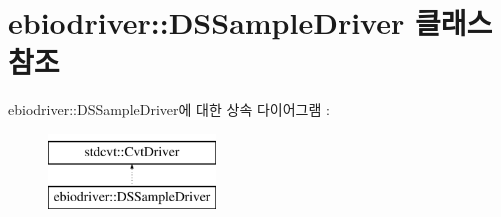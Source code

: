 \hypertarget{classebiodriver_1_1DSSampleDriver}{}\section{ebiodriver\+:\+:D\+S\+Sample\+Driver 클래스 참조}
\label{classebiodriver_1_1DSSampleDriver}
ebiodriver\+:\+:D\+S\+Sample\+Driver에 대한 상속 다이어그램 \+: \begin{figure}[H]
\begin{center}
\leavevmode
\includegraphics[height=2.000000cm]{classebiodriver_1_1DSSampleDriver}
\end{center}
\end{figure}
